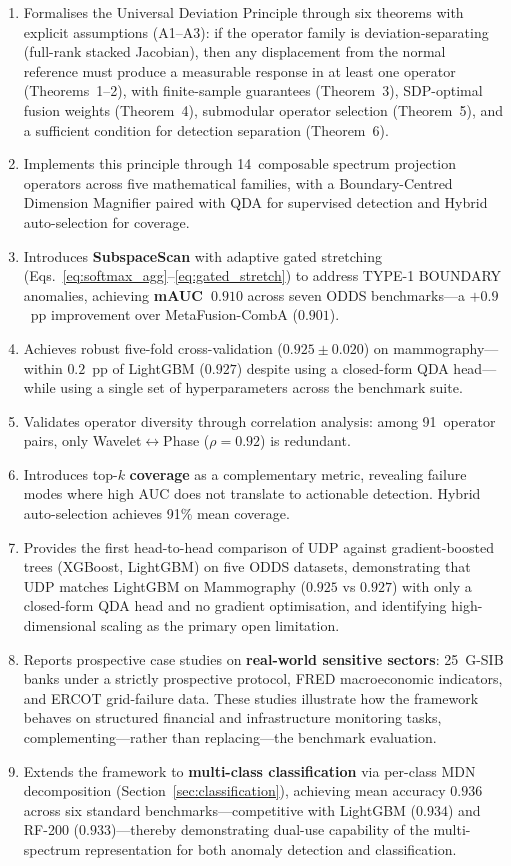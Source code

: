 \documentclass[journal]{IEEEtran}
\begin{document}
\begin{enumerate}
  \item Formalises the Universal Deviation Principle through six theorems with explicit assumptions (A1--A3): if the operator family is deviation-separating (full-rank stacked Jacobian), then any displacement from the normal reference must produce a measurable response in at least one operator (Theorems~1--2), with finite-sample guarantees (Theorem~3), SDP-optimal fusion weights (Theorem~4), submodular operator selection (Theorem~5), and a sufficient condition for detection separation (Theorem~6).
  \item Implements this principle through 14~composable spectrum projection operators across five mathematical families, with a Boundary-Centred Dimension Magnifier paired with QDA for supervised detection and Hybrid auto-selection for coverage.
  \item Introduces \textbf{SubspaceScan} with adaptive gated stretching (Eqs.~\eqref{eq:softmax_agg}--\eqref{eq:gated_stretch}) to address TYPE-1 BOUNDARY anomalies, achieving \textbf{mAUC~$0.910$} across seven ODDS benchmarks---a $+0.9$~pp improvement over MetaFusion-CombA ($0.901$).
  \item Achieves robust five-fold cross-validation ($0.925 \pm 0.020$) on mammography---within $0.2$~pp of LightGBM ($0.927$) despite using a closed-form QDA head---while using a single set of hyperparameters across the benchmark suite.
  \item Validates operator diversity through correlation analysis: among 91~operator pairs, only Wavelet$\leftrightarrow$Phase ($\rho{=}0.92$) is redundant.
  \item Introduces top-$k$ \textbf{coverage} as a complementary metric, revealing failure modes where high AUC does not translate to actionable detection. Hybrid auto-selection achieves 91\% mean coverage.
  \item Provides the first head-to-head comparison of UDP against gradient-boosted trees (XGBoost, LightGBM) on five ODDS datasets, demonstrating that UDP matches LightGBM on Mammography ($0.925$ vs $0.927$) with only a closed-form QDA head and no gradient optimisation, and identifying high-dimensional scaling as the primary open limitation.
  \item Reports prospective case studies on \textbf{real-world sensitive sectors}: 25~G-SIB banks under a strictly prospective protocol, FRED macroeconomic indicators, and ERCOT grid-failure data.  These studies illustrate how the framework behaves on structured financial and infrastructure monitoring tasks, complementing---rather than replacing---the benchmark evaluation.
  \item Extends the framework to \textbf{multi-class classification} via per-class MDN decomposition (Section~\ref{sec:classification}), achieving mean accuracy $0.936$ across six standard benchmarks---competitive with LightGBM ($0.934$) and RF-200 ($0.933$)---thereby demonstrating dual-use capability of the multi-spectrum representation for both anomaly detection and classification.
\end{enumerate}
\end{document}
